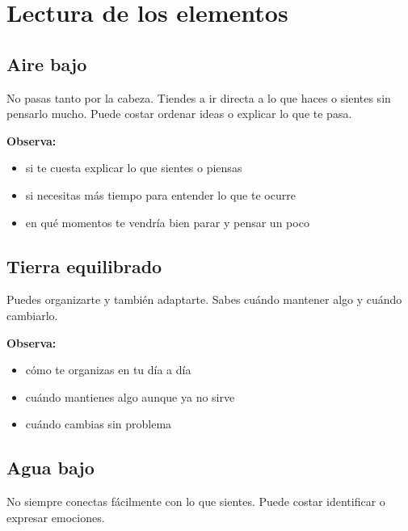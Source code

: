\documentclass[11pt,a4paper]{article}
\begin{document}
\vspace{0.8cm}



\section{Lectura de los elementos}

\subsection{Aire bajo}

No pasas tanto por la cabeza. Tiendes a ir directa a lo que haces o sientes sin pensarlo mucho. Puede costar ordenar ideas o explicar lo que te pasa.

\textbf{Observa:}
\begin{itemize}
\item si te cuesta explicar lo que sientes o piensas
\item si necesitas más tiempo para entender lo que te ocurre
\item en qué momentos te vendría bien parar y pensar un poco
\end{itemize}

\vspace{0.4cm}

\subsection{Tierra equilibrado}

Puedes organizarte y también adaptarte. Sabes cuándo mantener algo y cuándo cambiarlo.

\textbf{Observa:}
\begin{itemize}
\item cómo te organizas en tu día a día
\item cuándo mantienes algo aunque ya no sirve
\item cuándo cambias sin problema
\end{itemize}

\vspace{0.4cm}

\subsection{Agua bajo}

No siempre conectas fácilmente con lo que sientes. Puede costar identificar o expresar emociones.
\end{document}

